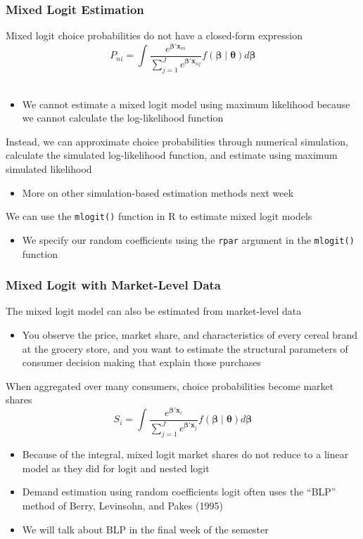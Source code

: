 \documentclass{beamer}\usepackage[]{graphicx}\usepackage[]{color}
\begin{document}
\begin{frame}\frametitle{Mixed Logit Estimation}
    Mixed logit choice probabilities do not have a closed-form expression
    $$P_{ni} = \int \frac{e^{\bm{\beta}' \bm{x}_{ni}}}{\sum_{j = 1}^J e^{\bm{\beta}' \bm{x}_{nj}}} f(\bm{\beta} \mid \bm{\theta}) d \bm{\beta}$$ \\
    \begin{itemize}
        \item We cannot estimate a mixed logit model using maximum likelihood because we cannot calculate the log-likelihood function
    \end{itemize}
    \vspace{2ex}
    Instead, we can approximate choice probabilities through numerical simulation, calculate the simulated log-likelihood function, and estimate using maximum simulated likelihood 
    \begin{itemize}
        \item More on other simulation-based estimation methods next week
    \end{itemize}
    \vspace{2ex}
    We can use the \texttt{mlogit()} function in R to estimate mixed logit models
    \begin{itemize}
        \item We specify our random coefficients using the \texttt{rpar} argument in the \texttt{mlogit()} function
    \end{itemize}
\end{frame}

\begin{frame}\frametitle{Mixed Logit with Market-Level Data}
    The mixed logit model can also be estimated from market-level data
    \begin{itemize}
        \item You observe the price, market share, and characteristics of every cereal brand at the grocery store, and you want to estimate the structural parameters of consumer decision making that explain those purchases
    \end{itemize}
    \vspace{2ex}
    When aggregated over many consumers, choice probabilities become market shares
    $$S_i = \int \frac{e^{\bm{\beta}' \bm{x}_i}}{\sum_{j = 1}^J e^{\bm{\beta}' \bm{x}_j}} f(\bm{\beta} \mid \bm{\theta}) d \bm{\beta}$$
    \begin{itemize}
        \item Because of the integral, mixed logit market shares do not reduce to a linear model as they did for logit and nested logit
        \item Demand estimation using random coefficients logit often uses the ``BLP'' method of Berry, Levinsohn, and Pakes (1995)
        \item We will talk about BLP in the final week of the semester
    \end{itemize}
\end{frame}
\end{document}
